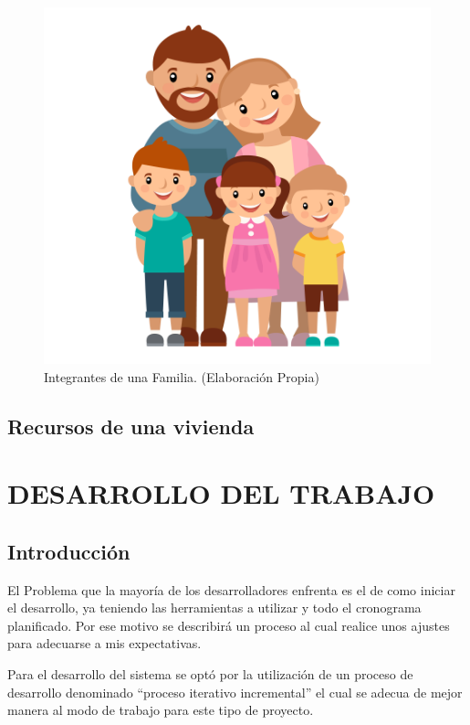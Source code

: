 \documentclass[11pt,letterpaper]{report}
\begin{document}
		\begin{figure}[ht]
		\centering
		\includegraphics[scale=0.4]{imagenes/family.png}
		\caption{Integrantes de una Familia. (Elaboración Propia)}
		\label{family} 
		\end{figure}
	\section{Recursos de una vivienda}

\chapter{DESARROLLO DEL TRABAJO}

	\section{Introducción }
	El Problema que la mayoría de los desarrolladores enfrenta es el de como iniciar el desarrollo, ya teniendo las herramientas a utilizar y todo el cronograma planificado. Por ese motivo se describirá un proceso al cual realice unos ajustes para adecuarse a mis expectativas.
	
Para el desarrollo del sistema se optó por la utilización de un proceso de desarrollo denominado “proceso iterativo incremental” el cual se adecua de mejor manera  al modo de trabajo para este tipo de proyecto.
\end{document}
